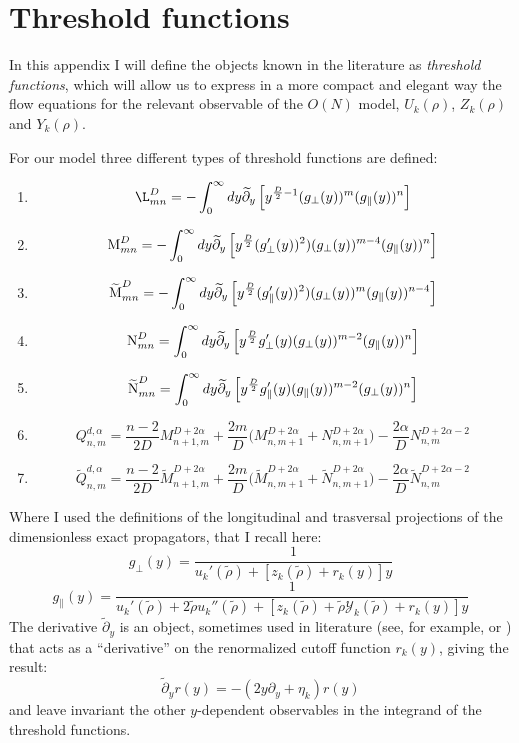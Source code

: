 \chapter{Threshold functions}
In this appendix I will define the objects known in the literature as \emph{threshold functions}, which will allow us to express in a more compact and elegant way the flow equations for the relevant observable of the $O(N)$ model, $U_k(\rho)$, $Z_k(\rho)$ and $Y_k(\rho)$.

For our model three different types of threshold functions are defined:

\begin{enumerate}
 \item $$\L^D_{mn} = -\int_0^\infty dy\widetilde{\partial}_y\left[y^{\frac{D}{2}-1}(g_\perp(y))^m(g_\parallel(y))^n\right]$$
 \item $${\operatorname{M}^D_{mn}} = -\int_0^\infty dy\widetilde{\partial}_y\left[y^{\frac{D}{2}}(g'_\perp(y))^2) (g_\perp(y))^{m-4}(g_\parallel(y))^n\right]$$
 \item $$\widetilde {\operatorname{M}}^D_{mn} = -\int_0^\infty dy \widetilde{\partial}_y\left[y^{\frac{D}{2}}(g'_\parallel(y))^2) (g_\perp(y))^{m}(g_\parallel(y))^{n-4}\right]$$
 \item $$\operatorname{N}^D_{mn} = \int_0^\infty dy\widetilde{\partial}_y\left[y^{\frac{D}{2}}g'_\perp(y)(g_\perp(y))^{m-2}(g_\parallel(y))^n\right]$$
 \item $$\widetilde {\operatorname{N}}^D_{mn} = \int_0^\infty dy\widetilde{\partial}_y\left[y^{\frac{D}{2}}g'_\parallel(y)(g_\parallel(y))^{m-2}(g_\perp(y))^n\right]$$
 \item $$ Q^{d,\alpha}_{n,m} = \frac{n-2}{2D} M^{D + 2\alpha}_{n+1,m} + \frac{2m}{D} \Big(M^{D + 2\alpha}_{n,m+1}+ N^{D + 2\alpha}_{n,m+1}\Big) - \frac{2\alpha}{D}N^{D + 2\alpha-2}_{n,m}$$
 \item $$ \widetilde Q^{d,\alpha}_{n,m} = \frac{n-2}{2D}\widetilde  M^{D + 2\alpha}_{n+1,m} + \frac{2m}{D} \Big(\widetilde M^{D + 2\alpha}_{n,m+1}+\widetilde  N^{D + 2\alpha}_{n,m+1}\Big) - \frac{2\alpha}{D}\widetilde N^{D + 2\alpha-2}_{n,m}$$
 \end{enumerate}
Where I used the definitions of the longitudinal and trasversal projections of the dimensionless exact propagators, that I recall here:
$$g_\perp(y) = \frac{1}{u_k'(\widetilde{\rho}) + [z_k(\widetilde{\rho}) + r_k(y)]y}$$
$$g_\parallel(y) = \frac{1}{u_k'(\widetilde{\rho}) + 2\widetilde{\rho}u_k''(\widetilde{\rho})+ [z_k(\widetilde{\rho}) + \widetilde{\rho}\mathcal{Y}_k(\widetilde{\rho})+ r_k(y)]y}$$
The derivative $\widetilde{\partial}_y$ is an object, sometimes used in literature (see, for example, \cite{dtilde} or \cite{delamotteintr}) that acts as a ``derivative''
on the renormalized cutoff function $r_k(y)$, giving the result:
$$\widetilde{\partial}_y r(y) = -(2y\partial_y + \eta_k)r(y)$$
and leave invariant the other $y$-dependent observables in the integrand of the threshold functions.

